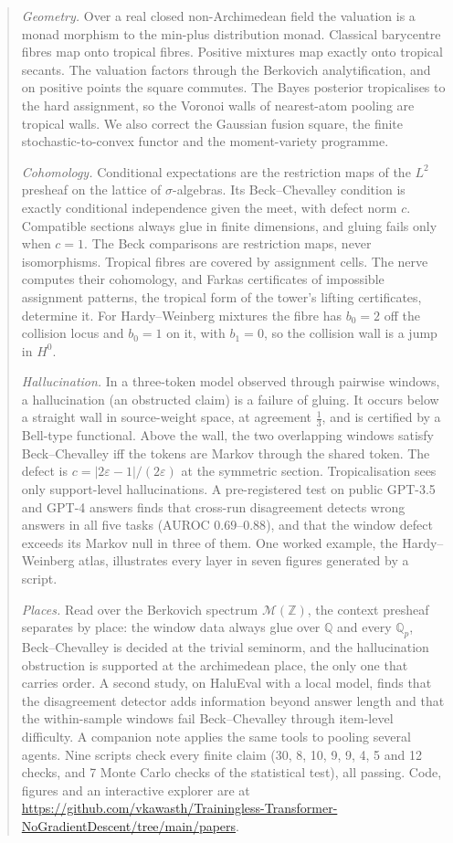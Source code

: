 \documentclass[11pt]{article}
\theoremstyle{definition}
\begin{document}
\begin{abstract}
\emph{Geometry.} Over a real closed non-Archimedean field the valuation is a monad morphism to the min-plus distribution monad.
Classical barycentre fibres map onto tropical fibres. Positive mixtures map exactly onto tropical secants. The valuation factors
through the Berkovich analytification, and on positive points the square commutes. The Bayes posterior tropicalises to the hard
assignment, so the Voronoi walls of nearest-atom pooling are tropical walls. We also correct the Gaussian fusion square, the finite
stochastic-to-convex functor and the moment-variety programme.

\emph{Cohomology.} Conditional expectations are the restriction maps of the $L^2$ presheaf on the lattice of $\sigma$-algebras. Its
Beck--Chevalley condition is exactly conditional independence given the meet, with defect norm $c$. Compatible sections always glue in
finite dimensions, and gluing fails only when $c=1$. The Beck comparisons are restriction maps, never isomorphisms. Tropical fibres
are covered by assignment cells. The nerve computes their cohomology, and Farkas certificates of impossible assignment patterns, the
tropical form of the tower's lifting certificates, determine it. For Hardy--Weinberg mixtures the fibre has $b_0=2$ off the
collision locus and $b_0=1$ on it, with $b_1=0$, so the collision wall is a jump in $H^0$.

\emph{Hallucination.} In a three-token model observed through pairwise windows, a hallucination (an obstructed claim) is a failure of
gluing. It occurs below a straight wall in source-weight space, at agreement $\tfrac13$, and is certified by a Bell-type functional.
Above the wall, the two overlapping windows satisfy Beck--Chevalley iff the tokens are Markov through the shared token. The defect is
$c=|2\varepsilon-1|/(2\varepsilon)$ at the symmetric section. Tropicalisation sees only support-level hallucinations. A pre-registered test on public GPT-3.5 and GPT-4 answers finds that
cross-run disagreement detects wrong answers in all five tasks (AUROC $0.69$--$0.88$), and that the window defect exceeds its Markov null
in three of them. One worked example, the Hardy--Weinberg
atlas, illustrates every layer in seven figures generated by a script.

\emph{Places.} Read over the Berkovich spectrum $\mathcal{M}(\mathbb{Z})$, the context presheaf separates by place: the window data
always glue over $\mathbb{Q}$ and every $\mathbb{Q}_p$, Beck--Chevalley is decided at the trivial seminorm, and the hallucination
obstruction is supported at the archimedean place, the only one that carries order. A second study, on HaluEval with a local model,
finds that the disagreement detector adds information beyond answer length and that the within-sample windows fail Beck--Chevalley
through item-level difficulty. A companion note applies the same tools to pooling several agents. Nine scripts check every finite claim (30, 8, 10, 9, 9, 4, 5 and 12 checks, and 7 Monte Carlo checks of the statistical test), all passing. Code, figures and an interactive explorer are at
\url{https://github.com/vkawasth/Trainingless-Transformer-NoGradientDescent/tree/main/papers}.
\end{abstract}
\end{document}
